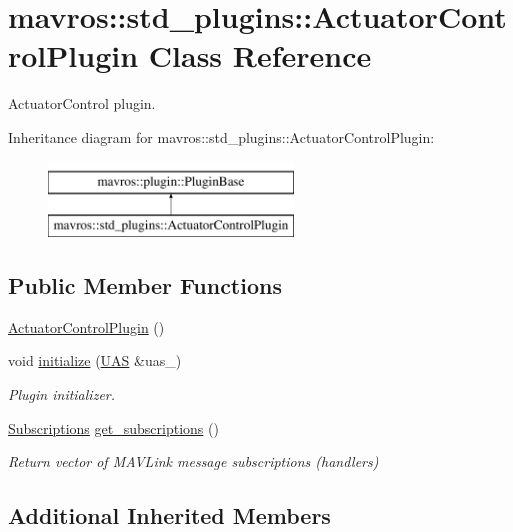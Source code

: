 \hypertarget{classmavros_1_1std__plugins_1_1ActuatorControlPlugin}{}\section{mavros\+::std\+\_\+plugins\+::Actuator\+Control\+Plugin Class Reference}
\label{classmavros_1_1std__plugins_1_1ActuatorControlPlugin}


Actuator\+Control plugin.  


Inheritance diagram for mavros\+::std\+\_\+plugins\+::Actuator\+Control\+Plugin\+:\begin{figure}[H]
\begin{center}
\leavevmode
\includegraphics[height=2.000000cm]{classmavros_1_1std__plugins_1_1ActuatorControlPlugin}
\end{center}
\end{figure}
\subsection*{Public Member Functions}
\begin{DoxyCompactItemize}
\item 
\mbox{\hyperlink{group__plugin_gab65fc2cc66cc9797ed137a145fa98cb5}{Actuator\+Control\+Plugin}} ()
\item 
void \mbox{\hyperlink{group__plugin_ga5da058a4de90d9d0a05ff7b66f6d108b}{initialize}} (\mbox{\hyperlink{classmavros_1_1UAS}{U\+AS}} \&uas\+\_\+)
\begin{DoxyCompactList}\small\item\em Plugin initializer. \end{DoxyCompactList}\item 
\mbox{\hyperlink{group__plugin_ga8967d61fc77040e0c3ea5a4585d62a09}{Subscriptions}} \mbox{\hyperlink{group__plugin_ga9f95e6748d25efba2ab30f5d701cf17c}{get\+\_\+subscriptions}} ()
\begin{DoxyCompactList}\small\item\em Return vector of M\+A\+V\+Link message subscriptions (handlers) \end{DoxyCompactList}\end{DoxyCompactItemize}
\subsection*{Additional Inherited Members}


